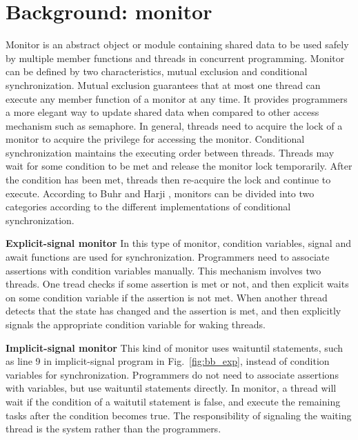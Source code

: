 \documentclass[preprint]{sigplanconf}
\begin{document}
\section{Background: monitor} \label{sec:bg}
Monitor is an abstract object or module containing shared data to be used safely
by multiple member functions and threads in concurrent programming. Monitor can
be defined by two characteristics, mutual exclusion and conditional 
synchronization. Mutual exclusion guarantees that at most one thread can 
execute any member function of a monitor at any time. It provides programmers a 
more elegant way to update shared data when compared to other access mechanism
such as semaphore. In general, threads need to acquire the lock of a monitor 
to acquire the privilege for accessing the monitor. Conditional synchronization 
maintains the executing order between threads. Threads may wait for some 
condition to be met and release the monitor lock temporarily. After the 
condition has been met, threads then re-acquire the lock and continue to 
execute. According to Buhr and Harji \cite{bh05}, monitors can be divided into 
two categories according to the different implementations of conditional 
synchronization. 
\begin{description}
    \item{\bf Explicit-signal monitor} In this type of monitor, condition
    variables, signal and await functions are used for synchronization. 
    Programmers need to associate assertions with condition variables manually.
    This mechanism involves two threads. One tread checks if some
    assertion is met or not, and then explicit waits on some condition variable 
    if the assertion is not met. When another thread detects that the state has 
    changed and the assertion is met, and then explicitly signals the 
    appropriate condition variable for waking threads.
    \item{\bf Implicit-signal monitor} This kind of monitor uses waituntil
    statements, such as line 9 in implicit-signal program in
    Fig.~\ref{fig:bb_exp}, instead of condition variables for
    synchronization. Programmers do not need to associate assertions with
    variables, but use waituntil statements directly. In
    monitor, a thread will wait if the condition of a waitutil
    statement is false, and execute the remaining tasks after the condition 
    becomes true. The responsibility of signaling the waiting thread is the
    system rather than the programmers. 
\end{description}
\end{document}

